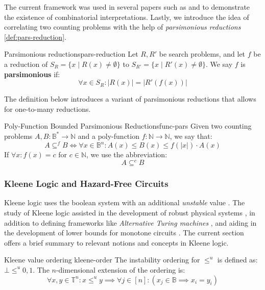 The current framework was used in several papers such as
\cite{ikenmeyer_WhatWhatNot_2022} and \cite{ikenmeyer_PositivitySymmetricGroup_2024}
to demonstrate the existence of combinatorial interpretations.
Lastly, we introduce the idea of correlating two counting problems with the help of
\textit{parsimonious reductions} \ref{def:pars-reduction}.


\begin{definitionbox}{Parsimonious reductions}{pars-reduction}
    Let $R, R'$ be search problems, and let $f$ be a reduction of
    $S_R = \{x \mid R(x) \neq \emptyset \}$ to $S_{R'} = \{x \mid R'(x) \neq \emptyset \}$.
    We say $f$ is \textbf{parsimonious} if:
    $$
        \forall x \in S_R : |R(x)| = |R'(f(x))|
    $$
\end{definitionbox}

The definition below introduces a variant of parsimonious reductions that allows
for one-to-many reductions.
\begin{definitionbox}{Poly-Function Bounded Parsimonious Reductions}{func-pars}
    Given two counting problems $A, B : \mathbb{B}^* \to \mathbb{N}$
    and a poly-function $f : \mathbb{N} \to \mathbb{N}$, we
    say that:
    $$
        A \subseteq^f B \iff \forall x \in \mathbb{B}^n:  A(x) \leq B(x) \leq f(|x|) \cdot A(x)
    $$
    If $\forall x : f(x) = c$ for $c \in \mathbb{N}$, we use the abbreviation:
    $$
        A \subseteq^c B
    $$
\end{definitionbox}


\subsubsection{Kleene Logic and Hazard-Free Circuits}

Kleene logic uses the boolean system with an additional \textit{unstable} value \cite{kleene_IntroductionMetamathematics_2009}.
The study of Kleene logic assisted in
the development of robust physical systems \cite{friedrichs_MetastabilityContainingCircuits_2018}, in addition to defining frameworks like \textit{Alternative Turing machines} \cite{kozen_TheoryComputation_2006}, and
aiding in the development of lower bounds for monotone circuits
\cite{eichelberger_HazardDetectionCombinational_1965, ikenmeyer_ComplexityHazardfreeCircuits_2019,ikenmeyer_KarchmerWigdersonGamesHazardfree_2022,  bund_SmallHazardFreeTransducers_2025}.
The current section offers a brief summary to relevant notions and concepts in Kleene logic.

\begin{definitionbox}{Kleene value ordering \cite{mukaidono_BternaryLogicFunction_1972}}{kleene-order}
    The instability ordering for $\leq^u$ is defined as: $\bot \leq^u 0,1$. The $n$-dimensional
    extension of the ordering is:
    $$
        \forall x,y \in \mathbb{T}^n: x \leq^u y \implies \forall j \in [n]: (x_j \in \mathbb{B} \implies x_i = y_i)
    $$
\end{definitionbox}


